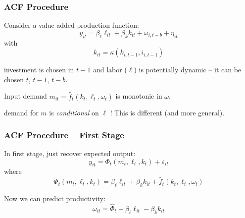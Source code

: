 \documentclass[11pt, aspectratio=169]{beamer}
\newenvironment{wideitemize}{\itemize\addtolength{\itemsep}{10pt}}{\enditemize}
\begin{document}
\begin{frame}[c]\frametitle{ACF Procedure}
    
\begin{wideitemize}
	\item Consider a value added production function:
	$$y_{it} = \beta_{\ell} \ell_{it} + \beta_k k_{it} + \omega_{i,t-b} + \eta_{it}$$
	with 
	$$k_{it} = \kappa(k_{i,t-1},i_{i,t-1})$$
	\item investment is chosen in $t-1$ and labor ($\ell$) is potentially dynamic -- it can be chosen $t$, $t-1$, $t-b$.
	\item Input demand $m_{it} = \tilde{f_t}(k_t,\ell_t,\omega_t)$ is monotonic in $\omega$.
	\item demand for $m$ is \emph{conditional} on $\ell\,\,$! This is different (and more general).
\end{wideitemize}

\end{frame}

\begin{frame}[c]\frametitle{ACF Procedure -- First Stage}
    
\begin{wideitemize}
	\item In first stage, just recover expected output:
	$$y_{it} = \Phi_t(m_t,\ell_t,k_t) + \varepsilon_{it}$$
	where
	$$\Phi_t(m_t,\ell_t,k_t) =  \beta_{\ell} \ell_{it} + \beta_k k_{it} + \tilde{f_t}(k_t,\ell_t,\omega_t)  $$
	\item Now we can predict productivity:
	$$\omega_{it} = \hat{\Phi}_t - \beta_{\ell} \ell_{it} - \beta_k k_{it} $$
\end{wideitemize}


\end{frame}
\end{document}
